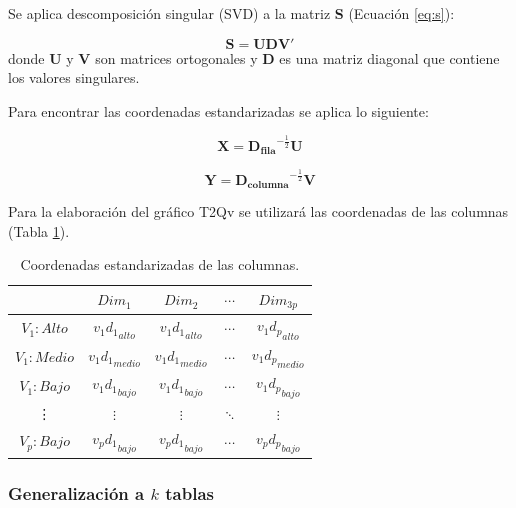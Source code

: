 \documentclass[mathematics,article,submit,moreauthors,pdftex]{mdpi}
\begin{document}
Se aplica descomposición singular (SVD) a la matriz \textbf{S} (Ecuación
\ref{eq:s}):

\begin{equation}
\mathbf{S}=\mathbf{U}\mathbf{D}\mathbf{V'}
\label{eq:svd}
\end{equation} donde \(\mathbf{U}\) y \(\mathbf{V}\) son matrices
ortogonales y \(\mathbf{D}\) es una matriz diagonal que contiene los
valores singulares.

Para encontrar las coordenadas estandarizadas se aplica lo siguiente:

\begin{equation}
\mathbf{X}=\mathbf{D_{fila}}^{-\frac{1}{2}} \mathbf{U}
\label{eq:xcoor}
\end{equation}

\begin{equation}
\mathbf{Y}=\mathbf{D_{columna}}^{-\frac{1}{2}} \mathbf{V}
\label{eq:ycoor}
\end{equation}

Para la elaboración del gráfico T2Qv se utilizará las coordenadas de las
columnas (Tabla \ref{tab:colcoor}).

\begin{table}[!ht]
\begin{center}
 \begin{tabular}{|| c ||c c c c||} 
 \hline
 & $Dim_{1}$      & $Dim_{2}$ & $\cdots$ & $Dim_{3p}$ \\ [0.5ex] 
 \hline\hline
  $V_{1}:Alto$    & ${v_{1}d_{1}}_{alto}$& ${v_{1}d_{1}}_{alto}$  & $\cdots$ & ${v_{1}d_{p}}_{alto}$\\
 \hline
 $V_{1}:Medio$    &${v_{1}d_{1}}_{medio}$ & ${v_{1}d_{1}}_{medio}$ & $\cdots$ & ${v_{1}d_{p}}_{medio}$\\
\hline
 $V_{1}:Bajo$     &${v_{1}d_{1}}_{bajo}$ & ${v_{1}d_{1}}_{bajo}$  &$\cdots$ & ${v_{1}d_{p}}_{bajo}$\\
\hline
\vdots & $\vdots$ & $\vdots$  &$\ddots$& $\vdots$\\
\hline
 $V_{p}:Bajo$     &${v_{p}d_{1}}_{bajo}$ & ${v_{p}d_{1}}_{bajo}$ & $\cdots$ & ${v_{p} d_{p}} _{bajo}$ \\ [1ex] 
 \hline
\end{tabular}\caption{Coordenadas estandarizadas de las columnas.}
\label{tab:colcoor}
\end{center}
\end{table}

\hypertarget{generalizaciuxf3n-a-k-tablas}{%
\subsubsection{\texorpdfstring{Generalización a \(k\)
tablas}{Generalización a k tablas}}\label{generalizaciuxf3n-a-k-tablas}}
\end{document}
